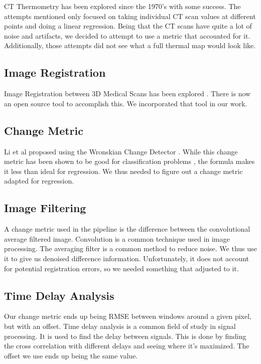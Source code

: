 \documentclass[]{spie}  %
\begin{document}
CT Thermometry has been explored since the 1970's with some success\cite{Fani14}. The attempts mentioned only focused on taking individual CT scan values at different points and doing a linear regression. Being that the CT scans have quite a lot of noise and artifacts, we decided to attempt to use a metric that accounted for it. Additionally, those attempts did not see what a full thermal map would look like.

\subsection{Image Registration}

Image Registration between 3D Medical Scans has been explored \cite{Ourselin01,Modat10}. There is now an open source tool to accomplish this. We incorporated that tool in our work.  

\subsection{Change Metric}

Li et al \cite{Li13} proposed using the Wronskian Change Detector \cite{Durucan01}. While this change metric has been shown to be good for classification problems \cite{Panda13,Durucan01,Ang11,Subudhi13}, the formula makes it less than ideal for regression. We thus needed to figure out a change metric adapted for regression.

\subsection{Image Filtering}

A change metric used in the pipeline is the difference between the convolutional average filtered image. Convolution is a common technique used in image processing. The averaging filter is a common method to reduce noise. We thus use it to give us denoised difference information. Unfortunately, it does not account for potential registration errors, so we needed something that adjusted to it. 

\subsection{Time Delay Analysis}

Our change metric ends up being RMSE between windows around a given pixel, but with an offset. Time delay analysis is a common field of study in signal processing. It is used to find the delay between signals. This is done by finding the cross correlation with different delays and seeing where it's maximized. The offset we use ends up being the same value. 
\end{document}
